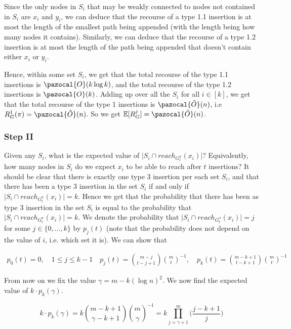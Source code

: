 \documentclass{article}
\begin{document}
Since the only nodes in $S_{i}$ that may be weakly connected to nodes not contained in $S_{i}$ are $x_{i}$ and $y_{i}$, we can deduce that the recourse of a type 1.1 insertion is at most the length of the smallest path being appended (with the length being how many nodes it contains). Similarly, we can deduce that the recourse of a type 1.2 insertion is at most the length of the path being appended that doesn't contain either $x_{i}$ or $y_{i}$.

Hence, within some set $S_{i}$, we get that the total recourse of the type 1.1 insertions is $\pazocal{O}(k \log k)$, and the total recourse of the type 1.2 insertions is $\pazocal{O}(k)$. Adding up over all the $S_{i}$ for all $i \in [k]$, we get that the total recourse of the type 1 insertions is $\pazocal{\tilde{O}}(n)$, i.e $R_{G}^{1}(\pi)=\pazocal{\tilde{O}}(n)$. So we get $\mathbb{E}[R_{G}^{j}]=\pazocal{\tilde{O}}(n)$.

\subsubsection{Step II}

Given any $S_{i}$, what is the expected value of $\vert S_{i} \cap reach_{G_{t}^{\pi}}(x_{i})\vert$? Equivalently, how many nodes in $S_{i}$ do we expect $x_{i}$ to be able to reach after $t$ insertions? It should be clear that there is exactly one type 3 insertion per each set $S_{i}$, and that there has been a type 3 insertion in the set $S_{i}$ if and only if $\vert S_{i} \cap reach_{G_{t}^{\pi}}(x_{i})\vert = k$. Hence we get that the probability that there has been as type 3 insertion in the set $S_{i}$ is equal to the probability that $\vert S_{i} \cap reach_{G_{t}^{\pi}}(x_{i})\vert = k$. We denote the probability that $\vert S_{i} \cap reach_{G_{t}^{\pi}}(x_{i})\vert = j$ for some $j \in \{0,...,k\}$ by $p_{j}(t)$ (note that the probability does not depend on the value of $i$, i.e. which set it is). We can show that

\begin{align*}
p_{0}(t) = 0,     \quad 1 \leq j \leq k-1 \quad p_{j}(t) = \binom{m-j}{t-j+1}\binom{m}{t}^{-1}, \quad p_{k}(t) = \binom{m-k+1}{t-k+1}\binom{m}{t}^{-1}
\end{align*}

From now on we fix the value $\gamma=m-k(\log n)^2$. We now find the expected value of $k \cdot p_{k}(\gamma)$.

\[k \cdot p_{k}(\gamma) = k\binom{m-k+1}{\gamma-k+1}\binom{m}{\gamma}^{-1} = k\prod_{j=\gamma + 1}^{m} \bigg( \frac{j-k+1}{j} \bigg) \] 
\end{document}

